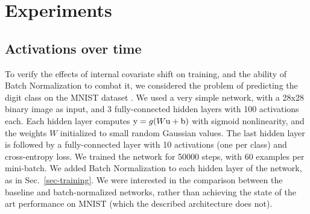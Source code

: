 \documentclass[twocolumn]{article}
\begin{document}
\section{Experiments}



\subsection{Activations over time}


To verify the effects of internal covariate shift on training, and the ability of Batch
Normalization to combat it, we considered the problem of predicting the digit
class on the MNIST dataset \cite{mnist}. We used a very simple network, with  a 28x28
binary image as  input, and  3 fully-connected hidden layers with 100 activations each. 
 Each hidden layer computes $\mathrm{y} = g(W\mathrm{u}+\mathrm{b})$ with  sigmoid nonlinearity, and the weights $W$ initialized to small random  Gaussian values. The last hidden layer is followed by a fully-connected layer with 10 activations (one per class) and  cross-entropy loss. We trained the network for 50000
steps, with  60 examples per mini-batch. We added Batch Normalization to each hidden layer of the network, as in Sec.~\ref{sec-training}.
 We were interested in the
comparison between the baseline and batch-normalized networks, rather than
achieving the state of the art performance on MNIST (which the described
architecture does not).
\end{document}
